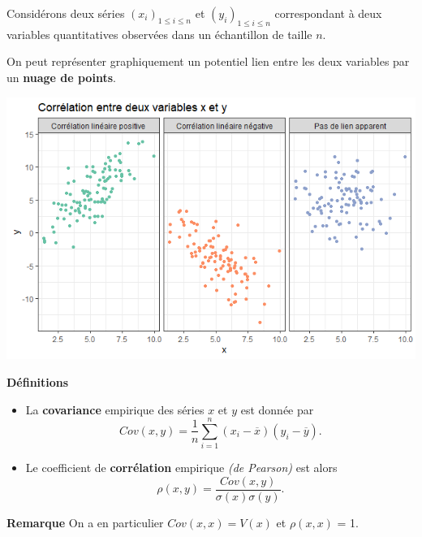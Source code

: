 \documentclass[aspectratio=169,xcolor=dvipsnames]{beamer}
\begin{document}
\begin{frame}
\textcolor{nyubluedarker}{\faCogs} Considérons deux séries $(x_i)_{1 \leqslant i \leqslant n}$ et $(y_i)_{1 \leqslant i \leqslant n}$ correspondant à deux variables quantitatives observées dans un échantillon de taille $n$.

\medskip

\textcolor{nyubluedarker}{\faLightbulb[regular]} On peut représenter graphiquement un potentiel lien entre les deux variables par un \textbf{nuage de points}.

	\begin{center}
	\includegraphics[scale=0.45]{expl_cor.png}
	\end{center}
\end{frame}

\begin{frame}
	\begin{block}{\textbf{Définitions}}
		\begin{itemize}
		\item La \textbf{covariance} empirique des séries $x$ et $y$ est donnée par
			\[
			Cov(x,y) = \dfrac{1}{n}\sum_{i=1}^n \left(x_i - \overline{x} \right) \left(y_i - \overline{y} \right).
			\]
		\item Le coefficient de \textbf{corrélation} empirique \emph{(de Pearson)} est alors
			\[
			\rho (x,y) = \dfrac{Cov(x,y)}{\sigma (x) \sigma (y)}.
			\]
		\end{itemize}
	\end{block}
	
	\begin{exampleblock}{\textbf{Remarque}}
	On a en particulier $Cov(x,x) = V(x)$ et $\rho(x,x)$ = 1.
	\end{exampleblock}
\end{frame}
\end{document}
